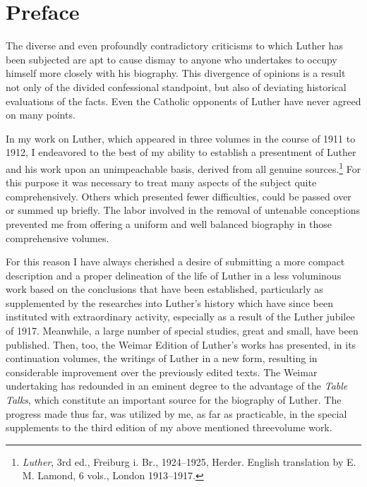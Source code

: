 \chapter*{Preface} %

The diverse and even profoundly contradictory criticisms to which
Luther has been subjected are apt to cause dismay to anyone who
undertakes to occupy himself more closely with his biography. This
divergence of opinions is a result not only of the divided confessional standpoint, but also of deviating historical evaluations of the
facts. Even the Catholic opponents of Luther have never agreed on many points.

In my work on Luther, which appeared in three volumes in the course of 1911 to 1912,
I endeavored to the best of my ability to establish a presentment of Luther and his work upon an unimpeachable basis,
derived from all genuine sources.\footnote{\textit{Luther}, 3rd ed., Freiburg i. Br., 1924--1925, Herder. English translation by E. M. Lamond, 6 vols., London 1913--1917.}
For this purpose it was necessary to treat many aspects of the subject quite comprehensively.
Others which presented fewer difficulties, could be passed over
or summed up briefly. The labor involved in the removal of untenable
conceptions prevented me from offering a uniform and well balanced biography in those comprehensive volumes.

For this reason I have always cherished a desire of submitting a
more compact description and a proper delineation of the life of
Luther in a less voluminous work based on the conclusions that
have been established, particularly as supplemented by the researches
into Luther’s history which have since been instituted with extraordinary activity, especially as a result of the Luther jubilee of
1917. Meanwhile, a large number of special studies, great and small,
have been published. Then, too, the Weimar Edition of Luther’s
works has presented, in its continuation volumes, the writings of Luther
in a new form, resulting in considerable improvement over the
previously edited texts. The Weimar undertaking has redounded in
an eminent degree to the advantage of the \textit{Table Talks}, which constitute an important source for the biography of Luther.
The progress made thus far, was utilized by me, as far as practicable, in the special supplements to the third edition of my above mentioned threevolume work.

